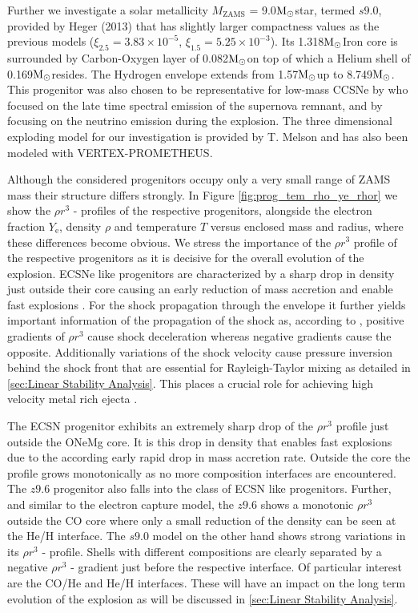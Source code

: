 \documentclass[fleqn,usenatbib]{mnras}
\newcommand{\solm}{\xspace\ensuremath{\rm{M_{\odot}}}}
\newcommand{\vertexprom}{\textsc{V{\footnotesize ERTEX}-P{\footnotesize ROMETHEUS}}\xspace}
\begin{document}
Further we investigate a solar metallicity $M_{\mathrm{ZAMS}}$ = 9.0\solm star, termed $s9.0$, provided by Heger (2013) that has slightly larger compactness values as the previous models ($\xi_{2.5}= 3.83 \times 10^{-5}$, $\xi_{1.5}= 5.25 \times 10^{-3}$). Its 1.318\solm Iron core is surrounded by Carbon-Oxygen layer of 0.082\solm on top of which a Helium shell of 0.169\solm resides. The Hydrogen envelope extends from 1.57\solm up to 8.749\solm. 
This progenitor was also chosen to be representative for low-mass CCSNe by \cite{Jerkstrand2017a} who focused on the late time spectral emission of the supernova remnant, and by \cite{Glas2018} focusing on the neutrino emission during the explosion. The three dimensional exploding model for our investigation is provided by T. Melson \citet{Melson2019} and has also been modeled with \vertexprom.

Although the considered progenitors occupy only a very small range of ZAMS mass their structure differs strongly. In Figure \ref{fig:prog_tem_rho_ye_rhor} we show the $\rho r^3$ - profiles of the respective progenitors, alongside the electron fraction $Y_{\mathrm{e}}$, density $\rho$ and temperature $T$ versus enclosed mass and radius, where these differences become obvious. We stress the importance of the $\rho r^3$ profile of the respective progenitors as it is decisive for the overall evolution of the explosion. ECSNe like progenitors are characterized by a sharp drop in density just outside their core causing an early reduction of mass accretion and enable fast explosions \cite{Mueller2019}.
For the shock propagation through the envelope it further yields important information of the propagation of the shock as, according to \cite{Sedov1961}, positive gradients of $\rho r^3$ cause shock deceleration whereas negative gradients cause the opposite. Additionally variations of the shock velocity cause pressure inversion behind the shock front that are essential for Rayleigh-Taylor mixing as detailed in \autoref{sec:Linear Stability Analysis}. This places a crucial role for achieving high velocity metal rich ejecta \cite{Wongwathanarat2015}.

The ECSN progenitor exhibits an extremely sharp drop of the $\rho r^3$ profile just outside the ONeMg core. It is this drop in density that enables fast explosions due to the according early rapid drop in mass accretion rate. Outside the core the profile grows monotonically as no more composition interfaces are encountered.
The $z9.6$ progenitor also falls into the class of ECSN like progenitors. Further, and similar to the electron capture model, the $z9.6$ shows a monotonic $\rho r^3$ outside the CO core where only a small reduction of the density can be seen at the He/H interface.
The $s9.0$ model on the other hand shows strong variations in its $\rho r^3$ - profile. Shells with different compositions are clearly separated by a negative $\rho r^3$ - gradient just before the respective interface. Of particular interest are the CO/He and He/H interfaces. These will have an impact on the long term evolution of the explosion as will be discussed in \autoref{sec:Linear Stability Analysis}.
\end{document}
